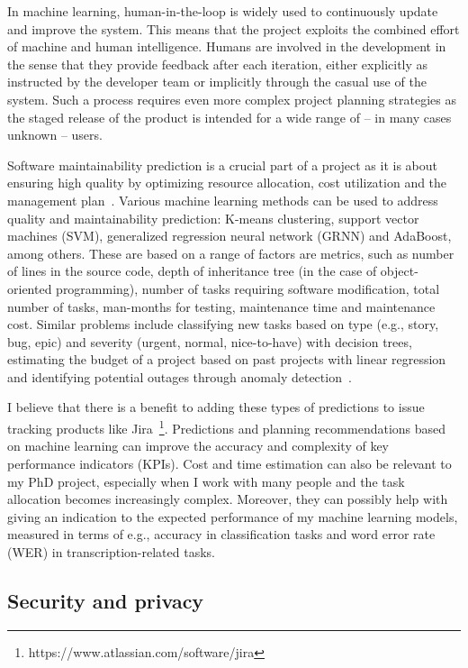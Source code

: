 \documentclass[11pt]{article}
\begin{document}
In machine learning, human-in-the-loop is widely used to continuously update and improve the system. This means that the project exploits the combined effort of machine and human intelligence. Humans are involved in the development in the sense that they provide feedback after each iteration, either explicitly as instructed by the developer team or implicitly through the casual use of the system. Such a process requires even more complex project planning strategies as the staged release of the product is intended for a wide range of -- in many cases unknown -- users.

Software maintainability prediction is a crucial part of a project as it is about ensuring high quality by optimizing resource allocation, cost utilization and the management plan~\cite{ALSOLAI2020106214}. Various machine learning methods can be used to address quality and maintainability prediction: K-means clustering, support vector machines (SVM), generalized regression neural network (GRNN) and AdaBoost, among others. These are based on a range of factors are metrics, such as number of lines in the source code, depth of inheritance tree (in the case of object-oriented programming), number of tasks requiring software modification, total number of tasks, man-months for testing, maintenance time and maintenance cost. Similar problems include classifying new tasks based on type (e.g., story, bug, epic) and severity (urgent, normal, nice-to-have) with decision trees, estimating the budget of a project based on past projects with linear regression and identifying potential outages through anomaly detection~\cite{kanakaris2019advancement}. 

I believe that there is a benefit to adding these types of predictions to issue tracking products like Jira~\footnote{https://www.atlassian.com/software/jira}. Predictions and planning recommendations based on machine learning can improve the accuracy and complexity of key performance indicators (KPIs). Cost and time estimation can also be relevant to my PhD project, especially when I work with many people and the task allocation becomes increasingly complex. Moreover, they can possibly help with giving an indication to the expected performance of my machine learning models, measured in terms of e.g., accuracy in classification tasks and word error rate (WER) in transcription-related tasks.

\subsection{Security and privacy}
\end{document}
